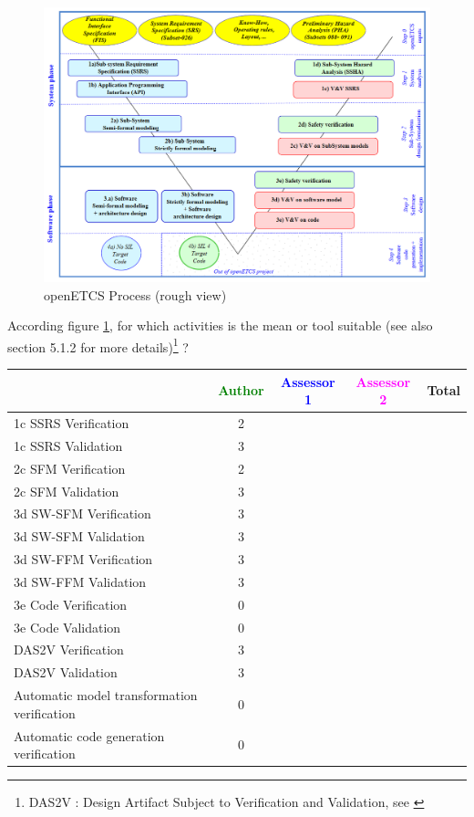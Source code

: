 \begin{figure}[htb]
  \centering
  \includegraphics[width=.9\textwidth]{images/ProcessOpenETCS-BeM.png}
  \caption{openETCS Process (rough view)}
  \label{fig:openETCSProcess}
\end{figure}

According figure \ref{fig:openETCSProcess}, for which activities is the mean or tool suitable (see also \citep{D4.1} section 5.1.2 for more details)\footnote{DAS2V : Design Artifact Subject to Verification and Validation, see \citep{D4.1}} ?


\begin{tabular}{|l | c | c | c | c|}
\hline
& \textcolor{green}{Author} & \textcolor{blue}{Assessor 1} & \textcolor{magenta}{Assessor 2} & Total \\
\hline 
1c SSRS Verification &2 & & &  \\
\hline
1c SSRS Validation &3 & & &  \\
\hline
2c SFM Verification &2 & & &  \\
\hline
2c SFM Validation &3 & & &  \\
\hline
3d SW-SFM Verification &3 & & &  \\
\hline
3d SW-SFM Validation &3 & & &  \\
\hline
3d SW-FFM Verification &3 & & &  \\
\hline
3d SW-FFM Validation &3 & & &  \\
\hline
3e Code Verification &0 & & &  \\
\hline
3e Code Validation &0 & & &  \\
\hline
DAS2V Verification &3 & & &  \\
\hline
DAS2V Validation &3 & & &  \\
\hline
Automatic model transformation verification &0 & & &  \\
\hline
Automatic code generation verification &0 & & &  \\
\hline
\end{tabular}


